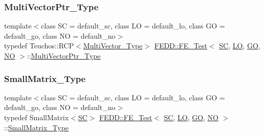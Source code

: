 \mbox{\label{classFEDD_1_1FE__Test_ac7c0363aa74e0bfcb903c13330c50185}} 
\subsubsection{\texorpdfstring{Multi\+Vector\+Ptr\+\_\+\+Type}{MultiVectorPtr\_Type}}
{\footnotesize\ttfamily template$<$class SC  = default\+\_\+sc, class LO  = default\+\_\+lo, class GO  = default\+\_\+go, class NO  = default\+\_\+no$>$ \\
typedef Teuchos\+::\+R\+CP$<$\hyperlink{classFEDD_1_1FE__Test_a431ec5a97628feb8a0a8d16874ecd060}{Multi\+Vector\+\_\+\+Type}$>$ \hyperlink{classFEDD_1_1FE__Test}{F\+E\+D\+D\+::\+F\+E\+\_\+\+Test}$<$ \hyperlink{fe__test__laplace_8cpp_a79c7e86a57edbb2a5a53242bcd04e41e}{SC}, \hyperlink{fe__test__laplace_8cpp_ad6a38c9f07d3fd633eefca5bccad8410}{LO}, \hyperlink{fe__test__laplace_8cpp_afa2946b509009b4f45eb04bd8c5b27d9}{GO}, \hyperlink{fe__test__laplace_8cpp_a5e24f37b28787429872b6ecb1d0417ce}{NO} $>$\+::\hyperlink{classFEDD_1_1FE__Test_ac7c0363aa74e0bfcb903c13330c50185}{Multi\+Vector\+Ptr\+\_\+\+Type}}

\mbox{\label{classFEDD_1_1FE__Test_a11f3375e690a493e9076b63b0f86edf4}} 
\subsubsection{\texorpdfstring{Small\+Matrix\+\_\+\+Type}{SmallMatrix\_Type}}
{\footnotesize\ttfamily template$<$class SC  = default\+\_\+sc, class LO  = default\+\_\+lo, class GO  = default\+\_\+go, class NO  = default\+\_\+no$>$ \\
typedef Small\+Matrix$<$\hyperlink{fe__test__laplace_8cpp_a79c7e86a57edbb2a5a53242bcd04e41e}{SC}$>$ \hyperlink{classFEDD_1_1FE__Test}{F\+E\+D\+D\+::\+F\+E\+\_\+\+Test}$<$ \hyperlink{fe__test__laplace_8cpp_a79c7e86a57edbb2a5a53242bcd04e41e}{SC}, \hyperlink{fe__test__laplace_8cpp_ad6a38c9f07d3fd633eefca5bccad8410}{LO}, \hyperlink{fe__test__laplace_8cpp_afa2946b509009b4f45eb04bd8c5b27d9}{GO}, \hyperlink{fe__test__laplace_8cpp_a5e24f37b28787429872b6ecb1d0417ce}{NO} $>$\+::\hyperlink{classFEDD_1_1FE__Test_a11f3375e690a493e9076b63b0f86edf4}{Small\+Matrix\+\_\+\+Type}}

